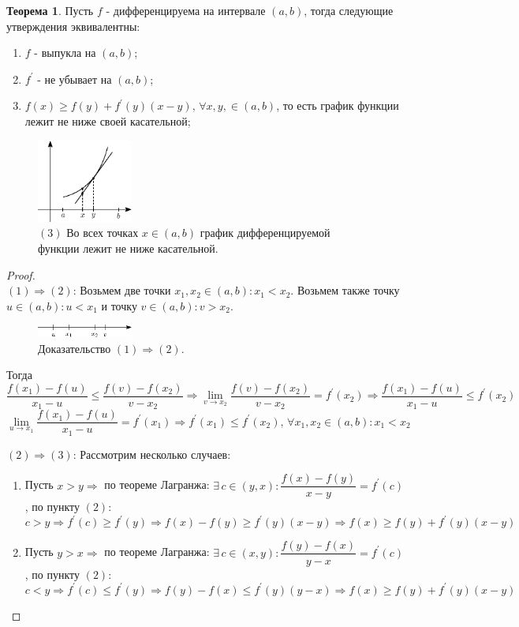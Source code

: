 \documentclass[12pt]{article}
\theoremstyle{definition}
\newtheorem{theorem}{Теорема}
\begin{document}
\begin{theorem}
	Пусть $f$ - дифференцируема на интервале $(a,b)$, тогда следующие утверждения эквивалентны:
	\begin{enumerate}[label={(\arabic*)}]
		\item $f$ - выпукла на $(a,b)$;
		\item $f^\prime$ - не убывает на $(a,b)$;
		\item $f(x) \geq f(y) + f^\prime(y)(x-y), \, \forall x,y, \in (a,b)$, то есть график функции лежит не ниже своей касательной;
	\end{enumerate}
\end{theorem}
\begin{figure}[H]
	\centering
	\includegraphics[width=0.28\textwidth]{27_9.eps}
	\caption{$(3)$ Во всех точках $x \in (a,b)$ график дифференцируемой функции лежит не ниже касательной.}
	\label{27_9}
\end{figure}
\begin{proof}\hfill\\
	$(1) \Rightarrow (2)$: Возьмем две точки $x_1, x_2 \in (a,b) \colon x_1 < x_2$. Возьмем также точку $u \in (a,b) \colon u < x_1$ и точку $v \in (a,b) \colon v > x_2$.
	\begin{figure}[H]
		\centering
		\includegraphics[width=0.28\textwidth]{27_10.eps}
		\caption{Доказательство $(1) \Rightarrow (2)$.}
		\label{27_10}
	\end{figure}
	Тогда 
	$$\dfrac{f(x_1) - f(u)}{x_1 - u}\leq \dfrac{f(v)-f(x_2)}{v - x_2} \Rightarrow \lim\limits_{v \to x_2}\dfrac{f(v)-f(x_2)}{v - x_2} = f^\prime(x_2) \Rightarrow \dfrac{f(x_1) - f(u)}{x_1 - u}\leq f^\prime(x_2) $$
	$$\lim\limits_{u \to x_1}\dfrac{f(x_1) - f(u)}{x_1 - u} = f^\prime(x_1) \Rightarrow f^\prime(x_1) \leq f^\prime(x_2), \, \forall x_1, x_2 \in (a,b) \colon x_1 < x_2$$
	
	$(2) \Rightarrow (3)$: Рассмотрим несколько случаев:
	\begin{enumerate}[label={\arabic*)}]
		\item Пусть $x > y \Rightarrow$ по теореме Лагранжа: $\exists \, c \in (y,x) \colon \dfrac{f(x) - f(y)}{x - y} = f^\prime(c)$, по пункту $(2)$:
		$$c > y \Rightarrow f^\prime(c) \geq f^\prime(y) \Rightarrow f(x) - f(y) \geq f^\prime(y)(x-y) \Rightarrow f(x) \geq f(y) + f^\prime(y)(x-y)$$
		\item Пусть $y > x \Rightarrow$ по теореме Лагранжа: $\exists \, c \in (x,y) \colon \dfrac{f(y) - f(x)}{y - x} = f^\prime(c)$, по пункту $(2)$:
		$$c < y \Rightarrow f^\prime(c) \leq f^\prime(y) \Rightarrow f(y) - f(x) \leq f^\prime(y)(y-x) \Rightarrow f(x) \geq f(y) + f^\prime(y)(x-y)$$
	\end{enumerate}

\end{proof}
\end{document}
